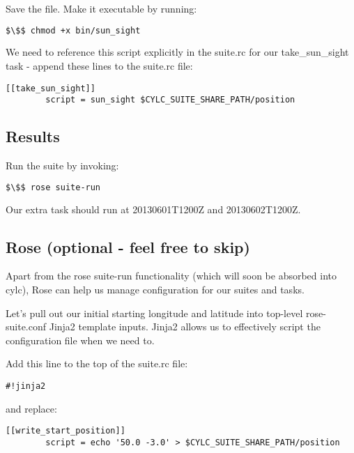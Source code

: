 Save the file. Make it executable by running:

\begin{lstlisting}[mathescape, language=bash]
$\$$ chmod +x bin/sun_sight
\end{lstlisting}

We need to reference this script explicitly in the suite.rc for our take\_sun\_sight task - append these lines to the suite.rc file:

\lstset{language=suiterc}
\begin{lstlisting}[columns=fullflexible]
    [[take_sun_sight]]
        script = sun_sight $CYLC_SUITE_SHARE_PATH/position
\end{lstlisting}

\subsection{Results}

Run the suite by invoking:
\begin{lstlisting}[mathescape, language=bash]
$\$$ rose suite-run
\end{lstlisting}

Our extra task should run at 20130601T1200Z and 20130602T1200Z.

\subsection{Rose (optional - feel free to skip)}

Apart from the rose suite-run functionality (which will soon be absorbed into cylc), Rose can help us manage configuration for our suites and tasks.

Let's pull out our initial starting longitude and latitude into top-level rose-suite.conf Jinja2 template inputs. Jinja2 allows us to effectively script the configuration file when we need to.

Add this line to the top of the suite.rc file:

\lstset{language=suiterc}
\begin{lstlisting}[columns=fullflexible]
#!jinja2
\end{lstlisting}

and replace:

\lstset{language=suiterc}
\begin{lstlisting}[columns=fullflexible]
    [[write_start_position]]
        script = echo '50.0 -3.0' > $CYLC_SUITE_SHARE_PATH/position
\end{lstlisting}


